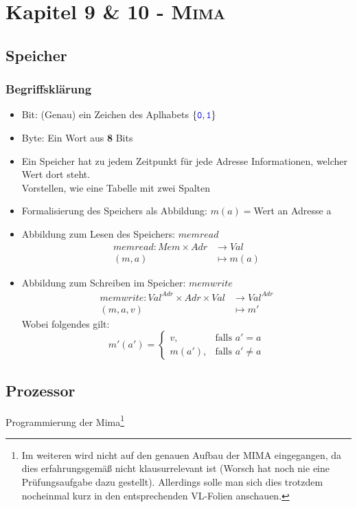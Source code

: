 \documentclass{article}
\newcommand{\kapitel}[2]{Kapitel #1 - \textsc{#2}}
\newcommand{\blue}[1]{\textcolor{blue}{#1}}
\newcommand{\important}[1]{\textcolor{importantColor}{#1}}
\newcommand{\word}[1]{\blue{\texttt{#1}}}
\newcommand{\set}[1]{\{#1\}}
\newcommand{\anfuehrung}[1]{\flqq #1\frqq}
\begin{document}
\newpage
\section{\kapitel{9 \& 10}{Mima}}
\subsection{Speicher}
\subsubsection{Begriffsklärung}
\begin{itemize}
    \item \important{Bit}: (Genau) ein Zeichen des Aplhabets $\set{\word{0},\word{1}}$
    \item \important{Byte}: Ein Wort aus \textbf{8} Bits
    \item Ein Speicher hat zu jedem Zeitpunkt für jede \important{Adresse} Informationen, welcher \important{Wert} dort steht.\\
    Vorstellen, wie eine Tabelle mit zwei Spalten
    \item Formalisierung des Speichers als Abbildung: $m(a)=$\anfuehrung{Wert an Adresse a}
    \item Abbildung zum Lesen des Speichers: $memread$
    \begin{align*}
        memread: Mem\times Adr&\to Val\\
        (m,a)&\mapsto m(a)
    \end{align*}
    \item Abbildung zum Schreiben im Speicher: $memwrite$
    \begin{align*}
        memwrite: Val^{Adr}\times Adr\times Val&\to Val^{Adr}\\
        (m,a, v)&\mapsto m'
    \end{align*}
    Wobei folgendes gilt:\\
    \[m'(a')=
    \begin{cases}
        v, &\text{falls } a'=a\\
        m(a'), &\text{falls } a'\not=a
    \end{cases}\]
\end{itemize}

\subsection{Prozessor}
Programmierung der Mima\footnote{Im weiteren wird nicht auf den genauen Aufbau der MIMA eingegangen, da dies erfahrungsgemäß nicht klausurrelevant ist (Worsch hat noch nie eine Prüfungsaufgabe dazu gestellt). Allerdings solle man sich dies trotzdem nocheinmal kurz in den entsprechenden VL-Folien anschauen.}
\end{document}
